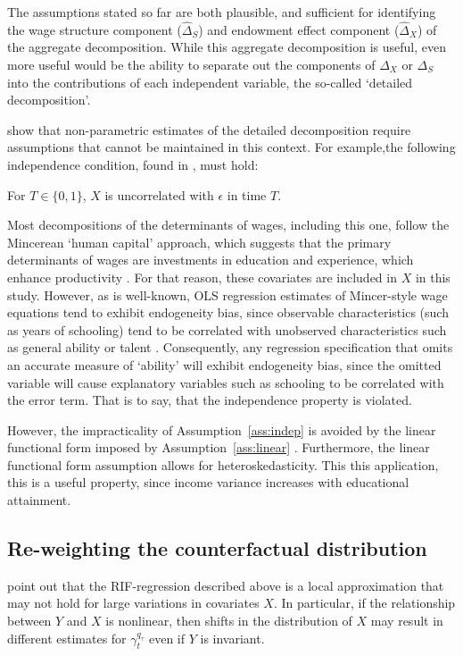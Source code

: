 The assumptions stated so far are both plausible, and sufficient for identifying the wage structure component ($\hat{\Delta}_S$) and endowment effect component ($\hat{\Delta}_X$) of the aggregate decomposition. While this aggregate decomposition is useful, even more useful would be the ability to separate out the components of $\Delta_X$ or $\Delta_S$ into the contributions of each independent variable, the so-called `detailed decomposition'. 

\citep[p.27]{Fortin2011} show that non-parametric estimates of the detailed decomposition require assumptions that cannot be maintained in this context. For example,the following independence condition, found in \citet{Matzkin2003}, must hold:
\begin{assumption}[Independence]\label{ass:indep}
  For $T\in\{0,1\}$, $X$ is uncorrelated with $\epsilon$ in time $T$.
\end{assumption}
Most decompositions of the determinants of wages, including this one, follow the Mincerean `human capital' approach, which suggests that the primary determinants of wages are investments in education and experience, which enhance productivity \citep{Mincer1962}. For that reason, these covariates are included in $X$ in this study. However, as is well-known, OLS regression estimates of Mincer-style wage equations tend to exhibit endogeneity bias, since observable characteristics (such as years of schooling) tend to be correlated with unobserved characteristics such as general ability or talent \citep{Card1999}. Consequently, any regression specification that omits an accurate measure of `ability' will exhibit endogeneity bias, since the omitted variable will cause explanatory variables such as schooling to be correlated with the error term. That is to say, that the independence property is violated.

However, the impracticality of Assumption~\ref{ass:indep} is avoided by the linear functional form imposed by Assumption~\ref{ass:linear} \citep[p.28]{Fortin2011}. Furthermore, the linear functional form assumption allows for heteroskedasticity. This this application, this is a useful property, since income variance increases with educational attainment.

\subsection{Re-weighting the counterfactual distribution}\label{sec:reweight}

\citet[p.19]{Firpo2011} point out that the RIF-regression described above is a local approximation that may not hold for large variations in covariates $X$. In particular, if the relationship between $Y$ and $X$ is nonlinear, then shifts in the distribution of $X$ may result in different estimates for $\gamma^{q_\tau}_t$ even if $Y$ is invariant. 

